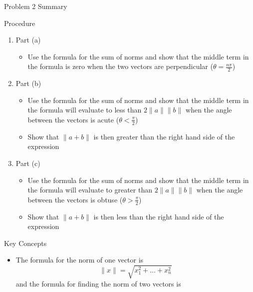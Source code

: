 \begin{summary}{Problem 2 Summary}
    \begin{statement}{Procedure}
        \begin{enumerate}[label = (\alph*)]
            \item Part (a)
            \begin{itemize}
                \item Use the formula for the sum of norms and show that the middle term in the formula is zero when the two vectors are perpendicular ($\theta = \frac{n\pi}{2}$)
            \end{itemize}
            \item Part (b)
            \begin{itemize}
                \item Use the formula for the sum of norms and show that the middle term in the formula will evaluate to less than $2\|a\|\|b\|$ when the angle between the vectors is acute 
                ($\theta < \frac{\pi}{2}$)
                \item Show that $\|a + b\|$ is then greater than the right hand side of the expression
            \end{itemize}
            \item Part (c)
            \begin{itemize}
                \item Use the formula for the sum of norms and show that the middle term in the formula will evaluate to greater than $2\|a\|\|b\|$ when the angle between the vectors is obtuse
                ($\theta > \frac{\pi}{2}$)
                \item Show that $\|a + b\|$ is then less than the right hand side of the expression
            \end{itemize}
        \end{enumerate}
    \end{statement}
    \begin{statement}{Key Concepts}
        \begin{itemize}
            \item The formula for the norm of one vector is
            \begin{equation*}
                \|x\| = \sqrt{x_{1}^{2} + \dots + x_{n}^{2}}
            \end{equation*}
            and the formula for finding the norm of two vectors is            
            \begin{equation*}

\end{equation*}
\end{itemize}
\end{statement}
\end{summary}

